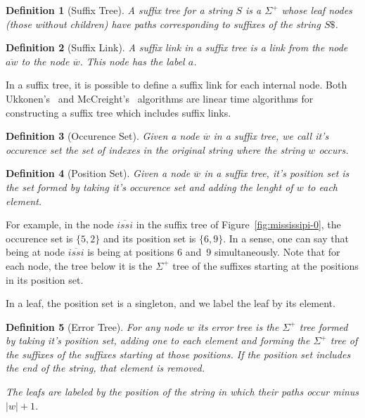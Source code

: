 \documentclass[letter,10pt]{article}
\newtheorem{definition}{Definition}
\begin{document}
\begin{definition}[Suffix Tree]
A \emph{suffix tree} for a string $S$ is a $\Sigma^+$ whose leaf nodes (those without children) have paths corresponding to suffixes of the string $S\$ $.
\end{definition}

\begin{definition}[Suffix Link]
A suffix link in a suffix tree is a link from the node $\overline{aw}$ to the node $\overline{w}$. This node has the label $a$.
\end{definition}

In a suffix tree, it is possible to define a suffix link for each internal node. Both Ukkonen's~\cite{ukkonen} and McCreight's~\cite{mccreight} algorithms are linear time algorithms for constructing a suffix tree which includes suffix links.

\begin{definition}[Occurence Set]
Given a node $\overline{w}$ in a suffix tree, we call it's \emph{occurence set} the set of indexes in the original string where the string $w$ occurs.
\end{definition}

\begin{definition}[Position Set]
Given a node $\overline{w}$ in a suffix tree, it's \emph{position set} is the set formed by taking it's occurence set and adding the lenght of $w$ to each element.
\end{definition}

For example, in the node $\overline{issi}$ in the suffix tree of Figure~\ref{fig:mississipi-0}, the occurence set is $\{5, 2\}$ and its position set is $\{6, 9\}$. In a sense, one can say that being at node $\overline{issi}$ is being at positions 6 and~9 simultaneously. Note that for each node, the tree below it is the $\Sigma^+$ tree of the suffixes starting at the positions in its position set.

In a leaf, the position set is a singleton, and we label the leaf by its element.

\begin{definition}[Error Tree]
For any node $w$ its error tree is the $\Sigma^+$ tree formed by taking it's position set, adding one to each element and forming the $\Sigma^+$ tree of the suffixes of the suffixes starting at those positions. If the position set includes the end of the string, that element is removed.

The leafs are labeled by the position of the string in which their paths occur minus $|w| + 1$.
\end{definition}
\end{document}
